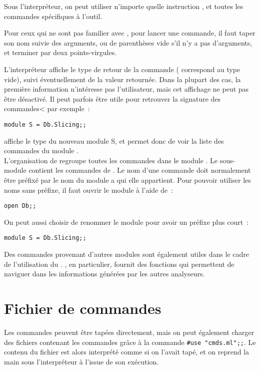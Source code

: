 Sous l'interpréteur, on peut utiliser n'importe quelle instruction \caml,
et toutes les commandes spécifiques à l'outil.

Pour ceux qui ne sont pas familier avec \caml,
pour lancer une commande, il faut taper son nom suivie des arguments,
ou de parenthèses vide s'il n'y a pas d'arguments, et terminer par deux
points-virgules.

L'interpréteur affiche le type de retour de la commande
( correspond au type vide),
suivi éventuellement de la valeur retournée.
Dans la plupart des cas, la première information n'intéresse pas l'utilisateur,
mais cet affichage ne peut pas être désactivé.
Il peut parfois être utile pour retrouver la signature des commandes<
par exemple~:

\centerline{\tt module S = Db.Slicing;;}

affiche le type du nouveau module S, et permet donc de voir la liste des
commandes du module .\\

L'organisation de \ppc regroupe toutes les commandes dans le module .
Le sous-module  contient les commandes de \slicing.
Le nom d'une commande doit normalement être préfixé par le nom du
module a qui elle appartient.
Pour pouvoir utiliser les noms sans
préfixe, il faut ouvrir le module à l'aide de~:

\centerline{\tt open Db;;}

On peut aussi choisir de renommer le module pour avoir un préfixe plus court~:

\centerline{\tt module S = Db.Slicing;;}

Des commandes provenant d'autres modules sont également utiles
dans le cadre de l'utilisation du \slicing.
, en particulier,
fournit des fonctions qui permettent de naviguer dans les
informations générées par les autres analyseurs.

\section{Fichier de commandes}

Les commandes peuvent être tapées directement, mais on peut également charger
des fichiers contenant les commandes grâce à la commande \verb!#use "cmds.ml";;!.
Le contenu du fichier  est alors interprété comme si on l'avait
tapé, et on reprend la main sous l'interpréteur à l'issue de son exécution.\\

